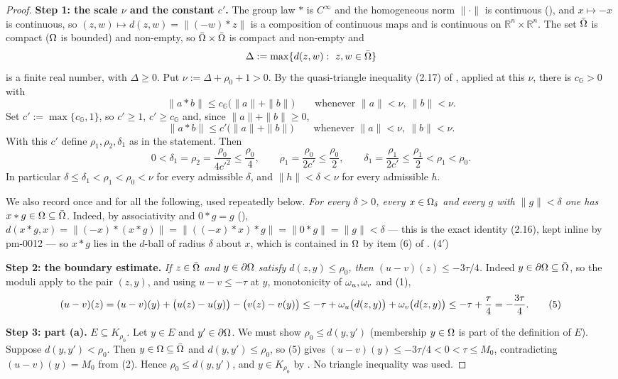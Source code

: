\begin{proof}
\medskip\noindent\textbf{Step 1: the scale $\nu$ and the constant $c'$.} The group law $*$ is $C^{\infty}$ and
the homogeneous norm $\|\cdot\|$ is continuous (), and
$x\mapsto-x$ is continuous, so $(z,w)\mapsto d(z,w)=\|(-w)*z\|$ is a composition of
continuous maps and is continuous on $\mathbb R^{n}\times\mathbb R^{n}$. The set $\bar{\Omega}$ is compact ($\Omega$ is bounded) and
non-empty, so $\bar{\Omega}\times\bar{\Omega}$ is compact and non-empty and
\[
 \Delta:=\max\{d(z,w):\ z,w\in\bar\Om\}
\]
is a finite real number, with $\Delta\ge0$. Put $\nu:=\Delta+\rho_0+1>0$. By the
quasi-triangle inequality (2.17) of , applied at this $\nu$,
there is $c_{\mathbb G}>0$ with
\[
 \|a*b\|\le c_{\mathbb G}\big(\|a\|+\|b\|\big)\qquad\text{whenever }\|a\|<\nu,\ \|b\|<\nu .
\]
Set $c':=\max\{c_{\mathbb G},1\}$, so $c'\ge1$, $c'\ge c_{\mathbb G}$ and, since
$\|a\|+\|b\|\ge0$,
\[
 \|a*b\|\le c'\big(\|a\|+\|b\|\big)\qquad\text{whenever }\|a\|<\nu,\ \|b\|<\nu . \tag{3}
\]
With this $c'$ define $\rho_1,\rho_2,\delta_1$ as in the statement. Then
\[
 0<\delta_1=\rho_2=\frac{\rho_0}{4c'^{2}}\le\frac{\rho_0}{4},\qquad
 \rho_1=\frac{\rho_0}{2c'}\le\frac{\rho_0}{2},\qquad
 \delta_1=\frac{\rho_1}{2c'}\le\frac{\rho_1}{2}<\rho_1<\rho_0 . \tag{4}
\]
In particular $\delta\le\delta_1<\rho_1<\rho_0<\nu$ for every admissible $\delta$, and
$\|h\|<\delta<\nu$ for every admissible $h$.

We also record once and for all the following, used repeatedly below. \emph{For every
$\delta>0$, every $x\in\Omega_\delta$ and every $g$ with $\|g\|<\delta$ one has
$x*g\in\Omega\subseteq\bar{\Omega}$.} Indeed, by associativity and $0*g=g$
(),
$d(x*g,x)=\|(-x)*(x*g)\|=\|((-x)*x)*g\|=\|0*g\|=\|g\|<\delta$ --- this is the exact
identity (2.16), kept inline by pm-0012 --- so $x*g$ lies in the $d$-ball of radius
$\delta$ about $x$, which is contained in $\Omega$ by item (6) of
. \hfill(4$'$)

\medskip\noindent\textbf{Step 2: the boundary estimate.} \emph{If $z\in\bar{\Omega}$ and
$y\in\partial\Omega$ satisfy $d(z,y)\le\rho_0$, then $(u-v)(z)\le-3\tau/4$.} Indeed $y\in\partial\Omega\subseteq\bar{\Omega}$,
so the moduli apply to the pair $(z,y)$, and using $u-v\le-\tau$ at $y$, monotonicity of
$\omega_u,\omega_v$ and (1),
\[
 (u-v)(z)=(u-v)(y)+\big(u(z)-u(y)\big)-\big(v(z)-v(y)\big)
 \le-\tau+\omega_u\big(d(z,y)\big)+\omega_v\big(d(z,y)\big)\le-\tau+\frac\tau4=-\frac{3\tau}4 .
 \tag{5}
\]

\medskip\noindent\textbf{Step 3: part (a).} \emph{$E\subseteq K_{\rho_0}$.} Let $y\in E$ and
$y'\in\partial\Omega$. We must show $\rho_0\le d(y,y')$ (membership $y\in\Omega$ is part of the
definition of $E$). Suppose $d(y,y')<\rho_0$. Then $y\in\Omega\subseteq\bar{\Omega}$ and
$d(y,y')\le\rho_0$, so (5) gives $(u-v)(y)\le-3\tau/4<0<\tau\le M_0$, contradicting
$(u-v)(y)=M_0$ from (2). Hence $\rho_0\le d(y,y')$, and $y\in K_{\rho_0}$ by
. No triangle inequality was used.


\end{proof}
